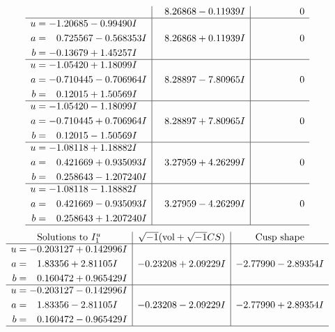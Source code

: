 \documentclass[1p]{elsarticle_modified}
\theoremstyle{definition}
\newcommand{\I}{\sqrt{-1}}
\begin{document}
$$\begin{array}{c|c|c}
 & \phantom{-}8.26868 - 0.11939 I & \phantom{-0.000000 } 0 \\ \hline\begin{aligned}
u &= -1.20685 - 0.99490 I \\
a &= \phantom{-}0.725567 - 0.568353 I \\
b &= -0.13679 + 1.45257 I\end{aligned}
 & \phantom{-}8.26868 + 0.11939 I & \phantom{-0.000000 } 0 \\ \hline\begin{aligned}
u &= -1.05420 + 1.18099 I \\
a &= -0.710445 - 0.706964 I \\
b &= \phantom{-}0.12015 + 1.50569 I\end{aligned}
 & \phantom{-}8.28897 - 7.80965 I & \phantom{-0.000000 } 0 \\ \hline\begin{aligned}
u &= -1.05420 - 1.18099 I \\
a &= -0.710445 + 0.706964 I \\
b &= \phantom{-}0.12015 - 1.50569 I\end{aligned}
 & \phantom{-}8.28897 + 7.80965 I & \phantom{-0.000000 } 0 \\ \hline\begin{aligned}
u &= -1.08118 + 1.18882 I \\
a &= \phantom{-}0.421669 + 0.935093 I \\
b &= \phantom{-}0.258643 - 1.207240 I\end{aligned}
 & \phantom{-}3.27959 + 4.26299 I & \phantom{-0.000000 } 0 \\ \hline\begin{aligned}
u &= -1.08118 - 1.18882 I \\
a &= \phantom{-}0.421669 - 0.935093 I \\
b &= \phantom{-}0.258643 + 1.207240 I\end{aligned}
 & \phantom{-}3.27959 - 4.26299 I & \phantom{-0.000000 } 0\\
 \hline 
 \end{array}$$\newpage$$\begin{array}{c|c|c}  
\text{Solutions to }I^u_{1}& \I (\text{vol} + \sqrt{-1}CS) & \text{Cusp shape}\\
 \hline 
\begin{aligned}
u &= -0.203127 + 0.142996 I \\
a &= \phantom{-}1.83356 + 2.81105 I \\
b &= \phantom{-}0.160472 + 0.965429 I\end{aligned}
 & -0.23208 + 2.09229 I & -2.77990 - 2.89354 I \\ \hline\begin{aligned}
u &= -0.203127 - 0.142996 I \\
a &= \phantom{-}1.83356 - 2.81105 I \\
b &= \phantom{-}0.160472 - 0.965429 I\end{aligned}
 & -0.23208 - 2.09229 I & -2.77990 + 2.89354 I\\
 \hline 
 \end{array}$$\newpage\newpage\renewcommand{\arraystretch}{1}
\end{document}
